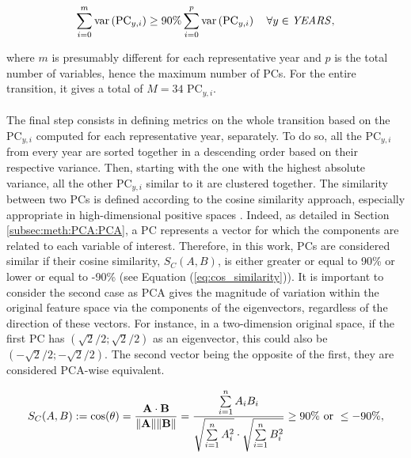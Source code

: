 \begin{equation}
\label{eq:PC_year}
\sum_{i=0}^m\text{var}\left(\text{PC}_{y,i}\right)\geq 90\% \sum_{i=0}^p\text{var}\left(\text{PC}_{y,i}\right) \quad \forall y \in \text{\emph{YEARS}},
\end{equation}

\noindent
where $m$ is presumably different for each representative year and $p$ is the total number of variables, hence the maximum number of PCs. For the entire transition, it gives a total of $M=34$ $\text{PC}_{y,i}$.\\

\\

\noindent
The final step consists in defining metrics on the whole transition based on the $\text{PC}_{y,i}$ computed for each representative year, separately. To do so, all the $\text{PC}_{y,i}$ from every year are sorted together in a descending order based on their respective variance. Then, starting with the one with the highest absolute variance, all the other $\text{PC}_{y,i}$ similar to it are clustered together. The similarity between two PCs is defined according to the cosine similarity approach, especially appropriate in high-dimensional positive spaces \cite{xia2015learning}. Indeed, as detailed in Section \ref{subsec:meth:PCA:PCA}, a PC represents a vector for which the components are related to each variable of interest. Therefore, in this work, PCs are considered similar if their cosine similarity, $S_C (A,B)$, is either greater or equal to 90\% or lower or equal to -90\% (see Equation (\ref{eq:cos_similarity})). It is important to consider the second case as \gls{PCA} gives the magnitude of variation within the original feature space via the components of the eigenvectors, regardless of the direction of these vectors. For instance, in a two-dimension original space, if the first PC has $(\sqrt{2}/2;\sqrt{2}/2)$ as an eigenvector, this could also be $(-\sqrt{2}/2;-\sqrt{2}/2)$. The second vector being the opposite of the first, they are considered \gls{PCA}-wise equivalent.

\begin{equation}
\label{eq:cos_similarity}
S_C (A,B):= \cos(\theta) = {\mathbf{A} \cdot \mathbf{B} \over \|\mathbf{A}\| \|\mathbf{B}\|} = \frac{ \sum\limits_{i=1}^{n}{A_i  B_i} }{ \sqrt{\sum\limits_{i=1}^{n}{A_i^2}} \cdot \sqrt{\sum\limits_{i=1}^{n}{B_i^2}} } \geq 90\%\text{ or } \leq -90\%,
\end{equation}

